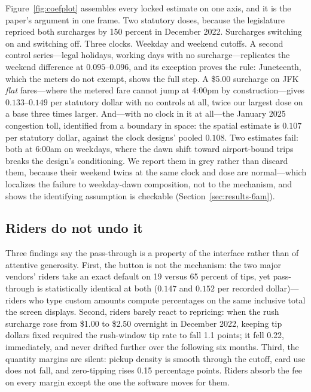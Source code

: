 Figure~\ref{fig:coefplot} assembles every locked estimate on one axis,
and it is the paper's argument in one frame. Two statutory doses,
because the legislature repriced both surcharges by 150 percent in
December 2022. Surcharges switching on and switching off. Three clocks.
Weekday and weekend cutoffs. A second control series---legal holidays,
working days with no surcharge---replicates the weekend difference at
$0.095$--$0.096$, and its exception proves the rule: Juneteenth, which
the meters do not exempt, shows the full step. A \$5.00 surcharge on
JFK \emph{flat} fares---where the metered fare cannot jump at 4:00pm by
construction---gives $0.133$--$0.149$ per statutory dollar with no
controls at all, twice our largest dose on a base three times larger.
And---with no clock in it at all---the January 2025 congestion toll,
identified from a boundary in space: the spatial estimate is $0.107$
per statutory dollar, against the clock designs' pooled $0.108$. Two estimates fail: both at 6:00am on
weekdays, where the dawn shift toward airport-bound trips breaks the
design's conditioning. We report them in grey rather than discard them,
because their weekend twins at the same clock and dose are
normal---which localizes the failure to weekday-dawn composition, not
to the mechanism, and shows the identifying assumption is checkable
(Section~\ref{sec:results-6am}).

\subsection{Riders do not undo it}
Three findings say the pass-through is a property of the interface
rather than of attentive generosity. First, the button is not the
mechanism: the two major vendors' riders take an exact default on 19
versus 65 percent of tips, yet pass-through is statistically identical
at both ($0.147$ and $0.152$ per recorded dollar)---riders who type
custom amounts compute percentages on the same inclusive total the
screen displays. Second, riders barely react to repricing: when the
rush surcharge rose from \$1.00 to \$2.50 overnight in December 2022,
keeping tip dollars fixed required the rush-window tip rate to fall
1.1 points; it fell 0.22, immediately, and never drifted further over
the following six months. Third, the quantity margins are silent:
pickup density is smooth through the cutoff, card use does not fall,
and zero-tipping rises 0.15 percentage points. Riders absorb the fee on
every margin except the one the software moves for them.

